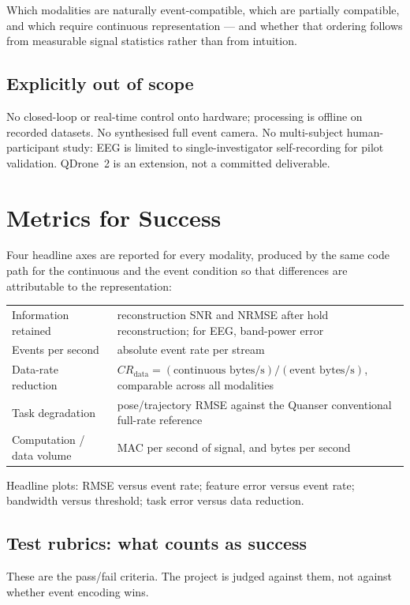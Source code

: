 \documentclass[11pt,a4paper]{article}
\begin{document}
Which modalities are naturally event-compatible, which are partially compatible, and
which require continuous representation --- and whether that ordering follows from
measurable signal statistics rather than from intuition.

\subsection{Explicitly out of scope}

No closed-loop or real-time control onto hardware; processing is offline on recorded
datasets. No synthesised full event camera. No multi-subject human-participant study:
EEG is limited to single-investigator self-recording for pilot validation. QDrone~2 is
an extension, not a committed deliverable.

\section{Metrics for Success}

Four headline axes are reported for every modality, produced by the same code path for
the continuous and the event condition so that differences are attributable to the
representation:

\begin{tabularx}{\linewidth}{@{}lX@{}}
\hline
Information retained & reconstruction SNR and NRMSE after hold reconstruction; for EEG, band-power error \\
Events per second & absolute event rate per stream \\
Data-rate reduction & $CR_{\text{data}} = (\text{continuous bytes/s}) / (\text{event bytes/s})$, comparable across all modalities \\
Task degradation & pose/trajectory RMSE against the Quanser conventional full-rate reference \\
Computation / data volume & MAC per second of signal, and bytes per second \\
\hline
\end{tabularx}

Headline plots: RMSE versus event rate; feature error versus event rate; bandwidth
versus threshold; task error versus data reduction.

\subsection{Test rubrics: what counts as success}

These are the pass/fail criteria. The project is judged against them, not against
whether event encoding wins.
\end{document}

